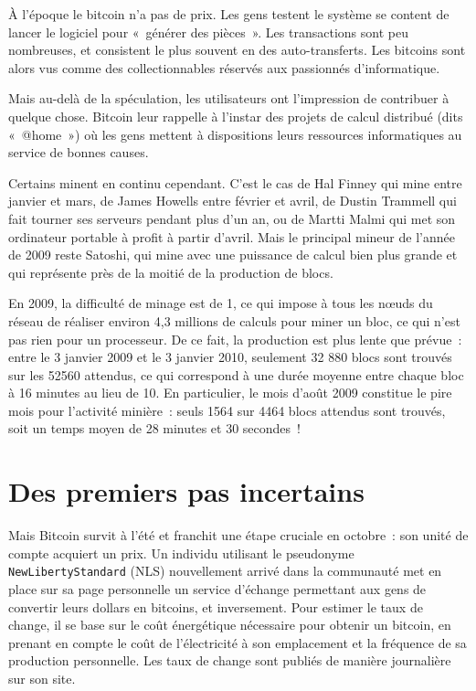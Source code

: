 
À l'époque le bitcoin n'a pas de prix. Les gens testent le système se content de lancer le logiciel pour «~générer des pièces~». Les transactions sont peu nombreuses, et consistent le plus souvent en des auto-transferts. Les bitcoins sont alors vus comme des collectionnables réservés aux passionnés d'informatique.

Mais au-delà de la spéculation, les utilisateurs ont l'impression de contribuer à quelque chose. Bitcoin leur rappelle à l'instar des projets de calcul distribué (dits «~@home~») où les gens mettent à dispositions leurs ressources informatiques au service de bonnes causes.

Certains minent en continu cependant. C'est le cas de Hal Finney qui mine entre janvier et mars, de James Howells entre février et avril, de Dustin Trammell qui fait tourner ses serveurs pendant plus d'un an, ou de Martti Malmi qui met son ordinateur portable à profit à partir d'avril. Mais le principal mineur de l'année de 2009 reste Satoshi, qui mine avec une puissance de calcul bien plus grande et qui représente près de la moitié de la production de blocs.

En 2009, la difficulté de minage est de 1, ce qui impose à tous les nœuds du réseau de réaliser environ 4,3 millions de calculs pour miner un bloc, ce qui n'est pas rien pour un processeur. De ce fait, la production est plus lente que prévue~: entre le 3 janvier 2009 et le 3 janvier 2010, seulement 32 880 blocs sont trouvés sur les 52560 attendus, ce qui correspond à une durée moyenne entre chaque bloc à 16 minutes au lieu de 10. En particulier, le mois d'août 2009 constitue le pire mois pour l'activité minière~: seuls 1564 sur 4464 blocs attendus sont trouvés, soit un temps moyen de 28 minutes et 30 secondes~!


\section{Des premiers pas incertains}

Mais Bitcoin survit à l'été et franchit une étape cruciale en octobre~: son unité de compte acquiert un prix. Un individu utilisant le pseudonyme \verb?NewLibertyStandard? (NLS) nouvellement arrivé dans la communauté met en place sur sa page personnelle un service d'échange permettant aux gens de convertir leurs dollars en bitcoins, et inversement. Pour estimer le taux de change, il se base sur le coût énergétique nécessaire pour obtenir un bitcoin, en prenant en compte le coût de l'électricité à son emplacement et la fréquence de sa production personnelle. Les taux de change sont publiés de manière journalière sur son site.

